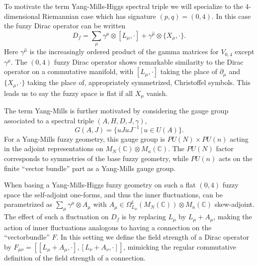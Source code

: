 \documentclass[10pt]{article}
\begin{document}
To motivate the term Yang-Mills-Higgs spectral triple we will specialize to the 4-dimensional Riemannian case which has signature $(p, q) = (0, 4)$.
In this case the fuzzy Dirac operator can be written
$$
  D_f = \sum_\mu \gamma^\mu \otimes [L_\mu, \cdot] + \gamma^{\hat{\mu}} \otimes \{X_\mu, \cdot\}.
$$
Here $\gamma^{\hat{\mu}}$ is the increasingly ordered product of the gamma matrices for $V_{0,4}$ except $\gamma^\mu$.
The $(0, 4)$ fuzzy Dirac operator shows remarkable similarity to the Dirac operator on a commutative manifold, with $[L_\mu, \cdot]$ taking the place of $\partial_\mu$ and $\{X_\mu, \cdot \}$ taking the place of, appropriately symmetrized, Christoffel symbols.
This leads us to say the fuzzy space is flat if all $X_\mu$ vanish.

The term Yang-Mills is further motivated by considering the gauge group \cite{Connes Inner Fluctuations, QFTNCG, VS} associated to a spectral triple $(A, H, D, J, \gamma)$,
$$
  G(A, J) = \{uJuJ^{-1} \,|\, u \in U(A)\}.
$$
For a Yang-Mills fuzzy geometry, this gauge group is $PU(N) \times PU(n)$ acting in the adjoint representations on $M_N(\mathbb{C}) \otimes M_n(\mathbb{C})$.
The $PU(N)$ factor corresponds to symmetries of the base fuzzy geometry, while $PU(n)$ acts on the finite ``vector bundle'' part as a Yang-Mills gauge group.

When basing a Yang-Mills-Higgs fuzzy geometry on such a flat $(0, 4)$ fuzzy space the self-adjoint one-forms, and thus the inner fluctuations, can be parametrized as $\sum_\mu \gamma^\mu \otimes A_\mu $ with $A_\mu \in \Omega^1_{L_\mu}(M_N(\mathbb{C})) \otimes M_n(\mathbb{C})$ skew-adjoint.
The effect of such a fluctuation on $D_f$ is by replacing $L_\mu$ by $L_\mu + A_\mu$, making the action of inner fluctuations analogous to having a connection on the ``vectorbundle'' $F$.
In this setting we define the field strength of a Dirac operator by $F_{\mu\nu} = \left[[L_\mu + A_\mu, \cdot], [L_\nu + A_\nu, \cdot] \right]$, mimicking the regular commutative definition of the field strength of a connection.
\end{document}
